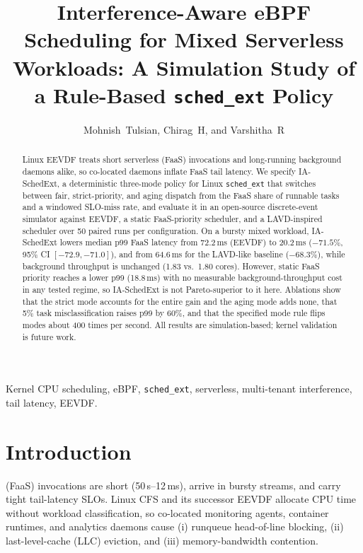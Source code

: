 \documentclass[journal]{IEEEtran}
\begin{document}
\title{Interference-Aware eBPF Scheduling for Mixed Serverless Workloads: A Simulation Study of a Rule-Based \texttt{sched\_ext} Policy}
\author{Mohnish~Tulsian, Chirag~H, and Varshitha~R\\
}
\maketitle

\begin{abstract}
Linux EEVDF treats short serverless (FaaS) invocations and long-running background daemons alike, so co-located daemons inflate FaaS tail latency. We specify IA-SchedExt, a deterministic three-mode policy for Linux \texttt{sched\_ext} that switches between fair, strict-priority, and aging dispatch from the FaaS share of runnable tasks and a windowed SLO-miss rate, and evaluate it in an open-source discrete-event simulator against EEVDF, a static FaaS-priority scheduler, and a LAVD-inspired scheduler over 50 paired runs per configuration. On a bursty mixed workload, IA-SchedExt lowers median p99 FaaS latency from 72.2\,ms (EEVDF) to 20.2\,ms ($-71.5\%$, 95\% CI $[-72.9,-71.0]$), and from 64.6\,ms for the LAVD-like baseline ($-68.3\%$), while background throughput is unchanged (1.83 vs.\ 1.80 cores). However, static FaaS priority reaches a lower p99 (18.8\,ms) with no measurable background-throughput cost in any tested regime, so IA-SchedExt is not Pareto-superior to it here. Ablations show that the strict mode accounts for the entire gain and the aging mode adds none, that 5\% task misclassification raises p99 by 60\%, and that the specified mode rule flips modes about 400 times per second. All results are simulation-based; kernel validation is future work.
\end{abstract}

\begin{IEEEkeywords}
Kernel CPU scheduling, eBPF, \texttt{sched\_ext}, serverless, multi-tenant interference, tail latency, EEVDF.
\end{IEEEkeywords}

\section{Introduction}
 (FaaS) invocations are short (50\,\textmu s--12\,ms), arrive in bursty streams, and carry tight tail-latency SLOs. Linux CFS and its successor EEVDF allocate CPU time without workload classification, so co-located monitoring agents, container runtimes, and analytics daemons cause (i) runqueue head-of-line blocking, (ii) last-level-cache (LLC) eviction, and (iii) memory-bandwidth contention.
\end{document}
